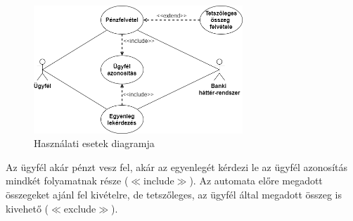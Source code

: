 \documentclass[12pt,margin=0px]{article}
\begin{document}
		\begin{figure}[H]
			\centering
			\includegraphics[width=0.7\textwidth]{img/hasznalatieset.png}
			\caption{Használati esetek diagramja}
		\end{figure}

    \noindent Az ügyfél akár pénzt vesz fel, akár az egyenlegét kérdezi le az ügyfél azonosítás mindkét folyamatnak része ($\ll$include$\gg$). Az automata előre megadott összegeket ajánl fel kivételre, de tetszőleges, az ügyfél által megadott összeg is kivehető ($\ll$exclude$\gg$).\\
\end{document}
